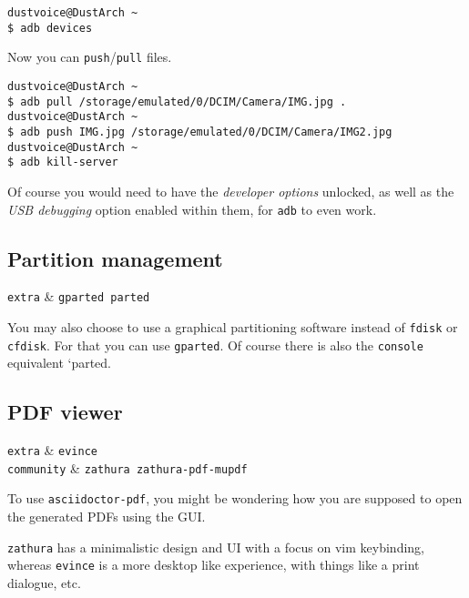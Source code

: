 \documentclass[10pt]{dustdoc}
\begin{document}
\begin{verbatim}
dustvoice@DustArch ~
$ adb devices
\end{verbatim}

Now you can \texttt{push}/\texttt{pull} files.

\begin{verbatim}
dustvoice@DustArch ~
$ adb pull /storage/emulated/0/DCIM/Camera/IMG.jpg .
dustvoice@DustArch ~
$ adb push IMG.jpg /storage/emulated/0/DCIM/Camera/IMG2.jpg
dustvoice@DustArch ~
$ adb kill-server
\end{verbatim}

\begin{NOTE}
    Of course you would need to have the \emph{developer options} unlocked, as well as the \emph{USB debugging} option enabled within them, for \texttt{adb} to even work.
\end{NOTE}

\subsection{Partition management}
\label{sec:partition-management}

\begin{packagetable}
    \texttt{extra} & \texttt{gparted parted} \\ 
\end{packagetable}

You may also choose to use a graphical partitioning software instead of \texttt{fdisk} or \texttt{cfdisk}.
For that you can use \texttt{gparted}.
Of course there is also the \texttt{console} equivalent `parted.

\subsection{PDF viewer}
\label{sec:gui-pdf-viewer}

\begin{packagetable}
    \texttt{extra} & \texttt{evince} \\ 
    \texttt{community} & \texttt{zathura zathura-pdf-mupdf} \\ 
\end{packagetable}

To use \texttt{asciidoctor-pdf}, you might be wondering how you are supposed to open the generated PDFs using the GUI.

\texttt{zathura} has a minimalistic design and UI with a focus on vim keybinding, whereas \texttt{evince} is a more desktop like experience, with things like a print dialogue, etc.
\end{document}
